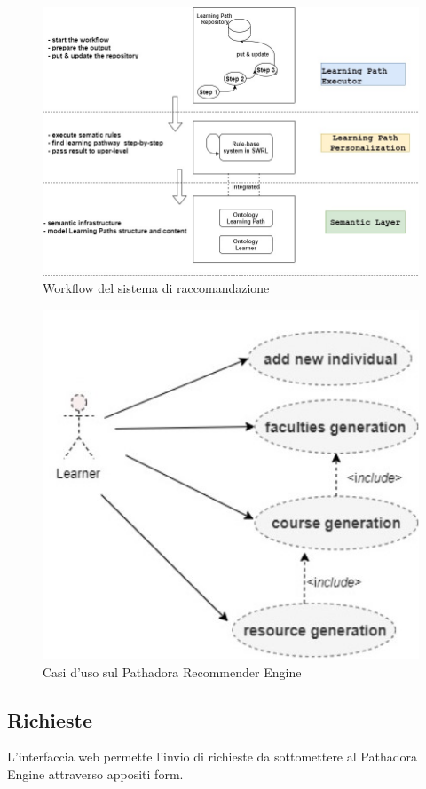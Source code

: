 \begin{figure}[H]
\centering
\includegraphics[scale=0.4]{res/diag-layers.jpg}
\caption{Workflow del sistema di raccomandazione}
\label{fig:diag-layers}
\end{figure}

\begin{figure}[H]
\centering
\includegraphics[scale=0.4]{res/pathadora-engine.jpg}
\caption{Casi d'uso sul Pathadora Recommender Engine}
\label{fig:pathadora-engine}
\end{figure}

\subsection{Richieste}
L'interfaccia web permette l'invio di richieste da sottomettere al Pathadora Engine attraverso appositi form.

